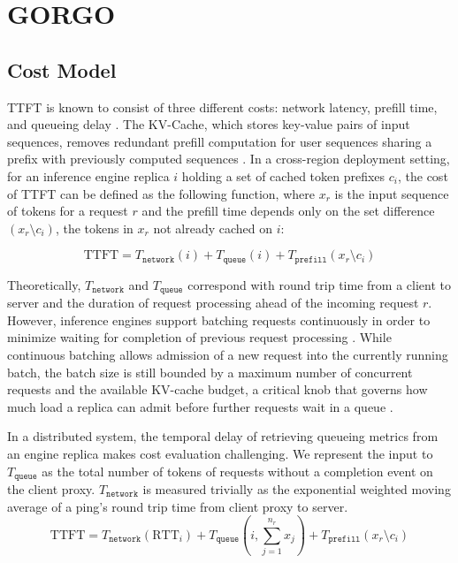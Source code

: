 \documentclass{article}
\begin{document}
\section{GORGO}
\label{sec:method}

\subsection{Cost Model}

TTFT is known to consist of three different costs: network latency, prefill time, and queueing delay \citep{banaserve2025}. The KV-Cache, which stores key-value pairs of input sequences, removes redundant prefill computation for user sequences sharing a prefix with previously computed sequences \citep{sglang2024}. In a cross-region deployment setting, for an inference engine replica $i$ holding a set of cached token prefixes $c_i$, the cost of TTFT can be defined as the following function, where $x_r$ is the input sequence of tokens for a request $r$ and the prefill time depends only on the set difference $(x_r \setminus c_i)$, the tokens in $x_r$ not already cached on $i$:

\begin{equation}
\mathrm{TTFT} = T_{\texttt{network}}(i) + T_{\texttt{queue}}(i) + T_{\texttt{prefill}}(x_r \setminus c_i)
\label{eq:ttft}
\end{equation}

Theoretically, $T_{\texttt{network}}$ and $T_{\texttt{queue}}$ correspond with round trip time from a client to server and the duration of request processing ahead of the incoming request $r$. However, inference engines support batching requests continuously in order to minimize waiting for completion of previous request processing \citep{orca2022}. While continuous batching allows admission of a new request into the currently running batch, the batch size is still bounded by a maximum number of concurrent requests and the available KV-cache budget, a critical knob that governs how much load a replica can admit before further requests wait in a queue \citep{vllm2023}.

In a distributed system, the temporal delay of retrieving queueing metrics from an engine replica makes cost evaluation challenging. We represent the input to $T_{\texttt{queue}}$ as the total number of tokens of requests without a completion event on the client proxy. $T_{\texttt{network}}$ is measured trivially as the exponential weighted moving average of a ping's round trip time from client proxy to server.
\begin{equation}
\mathrm{TTFT} = T_{\texttt{network}}(\mathrm{RTT}_i) + T_{\texttt{queue}}\left(i, \sum_{j=1}^{n_r} x_j\right) + T_{\texttt{prefill}}(x_r \setminus c_i)
\label{eq:ttft-proxy}
\end{equation}
\end{document}
